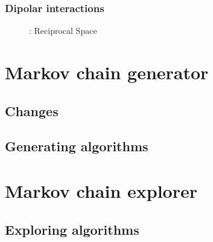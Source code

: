 \documentclass[a4paper, 12pt]{article}
\def\buildMode{buildmissing}
\begin{document}
            \subsubsection{Dipolar interactions}
            \begin{figure}[htb]
                \centering
                
                \caption{}
            \end{figure}
            \begin{figure}[htb]
                \centering
                
                \caption{: Reciprocal Space}
            \end{figure}
            \clearpage

    \section{Markov chain generator}

        \subsection{Changes}
        \begin{figure}[htb]
            \centering
            
            \caption{}
        \end{figure}
        \clearpage

        \subsection{Generating algorithms}
        \begin{figure}[htb]
            \centering
            
            \caption{}
        \end{figure}
        \clearpage

    \section{Markov chain explorer}

        \subsection{Exploring algorithms}
        \begin{figure}[htb]
            \centering
            
            \caption{}
        \end{figure}
        \clearpage
\end{document}
